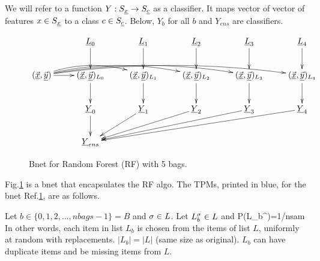 We will refer to a function
$Y:S_{\underline{x}} \rightarrow S_{\underline{c}}$
as a
classifier. It maps vector
of vector of features $x\in S_{\underline{x}}$
to a class $c\in S_{\underline{c}}$. Below, 
$Y_b$ for all $b$
and $Y_{ens}$
are classifiers.


\begin{figure}
$$
\xymatrix{
&
\rvL_0\ar[d]
&
\rvL_1\ar[d]
&
\rvL_2\ar[d]
&
\rvL_3\ar[d]
&
\rvL_4\ar[d]
\\
(\vec{\rvx},\vec{\rvy})
\ar[r]
\ar@/^1pc/[rr]
\ar@/^1pc/[rrr]
\ar@/^1pc/[rrrr]
\ar@/^1pc/[rrrrr]
&
(\vec{\rvx},\vec{\rvy})_{L_0}\ar[d]
&
(\vec{\rvx},\vec{\rvy})_{L_1}\ar[d]
&
(\vec{\rvx},\vec{\rvy})_{L_2}\ar[d]
&
(\vec{\rvx},\vec{\rvy})_{L_3}\ar[d]
&
(\vec{\rvx},\vec{\rvy})_{L_4}\ar[d]
\\
&
\rvY_0\ar[d]
&
\rvY_1\ar[dl]
&
\rvY_2\ar[dll]
&
\rvY_3\ar[dlll]
&
\rvY_4\ar[dllll]
\\
&
\rvY_{ens}
}
$$
\caption{Bnet for Random Forest (RF)
with 5 bags.}
\label{fig-rf-5-bags}
\end{figure}

Fig.\ref{fig-rf-5-bags}
is a bnet that encapsulates the RF algo.
The TPMs, printed in blue, for the
bnet Ref.\ref{fig-rf-5-bags},
are as follows.


Let $b\in\{0, 1, 2, \ldots, nbags-1\}=B$
and $\sigma\in L$. Let $L^\sigma_b\in L$ and
\beq\color{blue}
P(L_b^\s)=1/nsam
\eeq
In other words, each item in list $L_b$ 
is chosen from the items of list $L$, uniformly at random
with replacements.
 $|L_b|=|L|$ (same size as original).
$L_b$ can have duplicate items and be missing
items from $L$.

